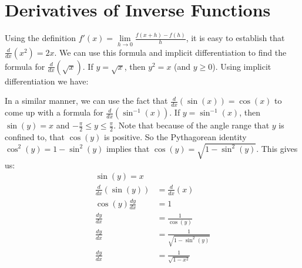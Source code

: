 \documentclass[12pt,]{book}
\theoremstyle{plain}
\theoremstyle{definition}
\numberwithin{equation}{section}
\newcounter{figstack}
\newcounter{figindex}
\newlength\fight
\newcommand\pushValignCaptionBottom[5][b]{%
\stepcounter{figstack}%
\expandafter\def\csname %
figalign\romannumeral\value{figstack}\endcsname{#1}%
\expandafter\def\csname %
figtype\romannumeral\value{figstack}\endcsname{#2}%
\expandafter\def\csname %
figwd\romannumeral\value{figstack}\endcsname{#3}%
\expandafter\def\csname %
figcontent\romannumeral\value{figstack}\endcsname{#4}%
\expandafter\def\csname %
figcap\romannumeral\value{figstack}\endcsname{#5}%
\setbox0=\hbox{%
\begin{#2}{#3}#4\end{#2}}%
\ifdim\dimexpr\ht0+\dp0\relax>\fight\global\setlength{\fight}{%
\dimexpr\ht0+\dp0\relax}\fi%
}
\newcommand\popValignCaptionBottom{%
\setcounter{figindex}{0}%
\hfill%
\whiledo{\value{figindex}<\value{figstack}}{%
\stepcounter{figindex}%
\def\tmp{\csname figwd\romannumeral\value{figindex}\endcsname}%
\begin{\csname figtype\romannumeral\value{figindex}\endcsname}[t]{\tmp}%
\centering%
\stackinset{c}{}%
{\csname figalign\romannumeral\value{figindex}\endcsname}{}%
{\csname figcontent\romannumeral\value{figindex}\endcsname}%
{\rule{0pt}{\fight}}\par%
\csname figcap\romannumeral\value{figindex}\endcsname%
\end{\csname figtype\romannumeral\value{figindex}\endcsname}%
\hfill%
}%
\setcounter{figstack}{0}%
\setlength{\fight}{0pt}%
\hfill%
}
\newcommand{\fe}[2]{#1\mathopen{}\left(#2\right)\mathclose{}}
\newcommand{\fd}[1]{#1'}
\newcommand{\lz}[2]{\frac{d#1}{d#2}}
\newcommand{\lzoo}[2]{{\frac{d}{d#1}}{\left(#2\right)}}
\begin{document}
\section[Derivatives of Inverse Functions]{Derivatives of Inverse Functions}\label{section-derivatives-of-inverse-functions}
Using the definition \(\fe{\fd{f}}{x}=\lim\limits_{h\to0}\frac{\fe{f}{x+h}-\fe{f}{h}}{h}\), it is easy to establish that \(\lzoo{x}{x^2}=2x\). We can use this formula and implicit differentiation to find the formula for \(\lzoo{x}{\sqrt{x}}\).  If \(y=\sqrt{x}\), then \(y^2=x\) (and \(y\geq0\)). Using implicit differentiation we have:%
\par
In a similar manner, we can use the fact that \(\lzoo{x}{\fe{\sin}{x}}=\fe{\cos}{x}\) to come up with a formula for \(\lzoo{x}{\fe{\sin^{-1}}{x}}\). If \(y=\fe{\sin^{-1}}{x}\), then \(\fe{\sin}{y}=x\) and \(-\frac{\pi}{2}\leq y\leq \frac{\pi}{2}\). Note that because of the angle range that \(y\) is confined to, that \(\fe{\cos}{y}\) is positive. So the Pythagorean identity \(\fe{\cos^2}{y}=1-\fe{\sin^2}{y}\) implies that \(\fe{\cos}{y}=\sqrt{1-\fe{\sin^2}{y}}\). This gives us:\begin{align*}
\fe{\sin}{y}=x\\
\lzoo{x}{\fe{\sin}{y}}&=\lzoo{x}{x}\\
\fe{\cos}{y}\lz{y}{x}&=1\\
\lz{y}{x}&=\frac{1}{\fe{\cos}{y}}\\
\lz{y}{x}&=\frac{1}{\sqrt{1-\fe{\sin^2}{y}}}\\
\lz{y}{x}&=\frac{1}{\sqrt{1-x^2}}
\end{align*}%
\typeout{************************************************}
\typeout{************************************************}
\end{document}

